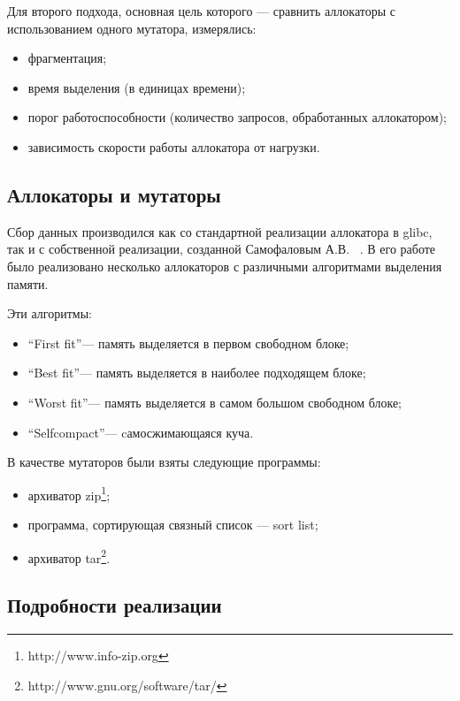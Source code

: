    Для второго подхода, основная цель которого --- сравнить аллокаторы с использованием одного мутатора, 
   измерялись:
   \begin{itemize}
         \item фрагментация; 
         \item время выделения (в единицах времени);
         \item порог работоспособности (количество запросов, обработанных аллокатором);
         \item зависимость скорости работы аллокатора от нагрузки.
   \end{itemize}
      
   \subsection{Аллокаторы и мутаторы}
   
   Сбор данных производился как со стандартной реализации аллокатора в glibc, так и с собственной реализации,
   созданной Самофаловым А.В. ~\cite{samofal}. В его работе было реализовано несколько аллокаторов с различными алгоритмами
   выделения памяти.
   
   Эти алгоритмы:
   \begin{itemize}
      \item \textquotedblleft First fit\textquotedblright --- память выделяется в первом свободном блоке;
      \item \textquotedblleft Best fit\textquotedblright --- память выделяется в наиболее подходящем блоке;
      \item \textquotedblleft Worst fit\textquotedblright --- память выделяется в самом большом свободном блоке;
      \item \textquotedblleft Selfcompact\textquotedblright --- cамосжимающаяся куча.
   \end{itemize}
   
   В качестве мутаторов были взяты следующие программы:
   \begin{itemize}
        \item архиватор zip\footnote{http://www.info-zip.org};
   	    \item программа, сортирующая связный список --- sort list;
   	    \item архиватор tar\footnote{http://www.gnu.org/software/tar/}.
   \end{itemize}
   
   \subsection{Подробности реализации}
   
